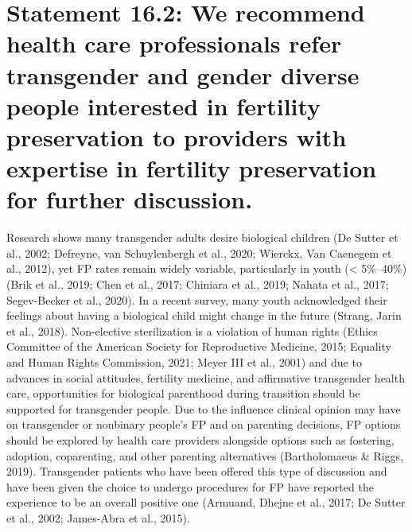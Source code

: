 \documentclass[
]{book}
\begin{document}
\hypertarget{statement-16.2-we-recommend-health-care-professionals-refer-transgender-and-gender-diverse-people-interested-in-fertility-preservation-to-providers-with-expertise-in-fertility-preservation-for-further-discussion.}{%
\section*{Statement 16.2: We recommend health care professionals refer transgender and gender diverse people interested in fertility preservation to providers with expertise in fertility preservation for further discussion.}\label{statement-16.2-we-recommend-health-care-professionals-refer-transgender-and-gender-diverse-people-interested-in-fertility-preservation-to-providers-with-expertise-in-fertility-preservation-for-further-discussion.}}

Research shows many transgender adults desire
biological children (De Sutter et al., 2002;
Defreyne, van Schuylenbergh et al., 2020;
Wierckx, Van Caenegem et al., 2012), yet FP
rates remain widely variable, particularly in youth
(\textless{} 5\%--40\%) (Brik et al., 2019; Chen et al., 2017;
Chiniara et al., 2019; Nahata et al., 2017;
Segev-Becker et al., 2020). In a recent survey,
many youth acknowledged their feelings about
having a biological child might change in the
future (Strang, Jarin et al., 2018). Non-elective
sterilization is a violation of human rights (Ethics
Committee of the American Society for
Reproductive Medicine, 2015; Equality and
Human Rights Commission, 2021; Meyer III
et al., 2001) and due to advances in social attitudes, fertility medicine, and affirmative transgender health care, opportunities for biological
parenthood during transition should be supported for transgender people. Due to the influence clinical opinion may have on transgender
or nonbinary people's FP and on parenting decisions, FP options should be explored by health
care providers alongside options such as fostering, adoption, coparenting, and other parenting
alternatives (Bartholomaeus \& Riggs, 2019).
Transgender patients who have been offered this
type of discussion and have been given the
choice to undergo procedures for FP have
reported the experience to be an overall positive
one (Armuand, Dhejne et al., 2017; De Sutter
et al., 2002; James-Abra et al., 2015).
\end{document}
